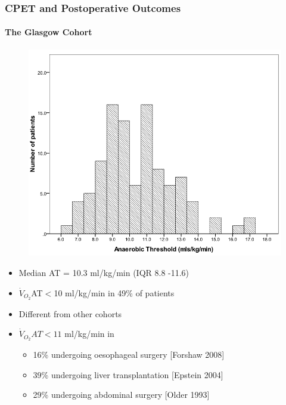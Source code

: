 \documentclass[10pt]{beamer}
\begin{document}
\begin{frame}
	\frametitle{CPET and Postoperative Outcomes}
	\framesubtitle{The Glasgow Cohort}
	\begin{figure}
		\centering
		\includegraphics[height=0.35\textheight]{../Figures/cpet_outcomes_dist_of_AT}
	\end{figure}

	\begin{itemize}
		\item Median AT = 10.3 ml/kg/min (IQR 8.8 -11.6)
		\item $\dot{V}_{O_2}$AT$<$10 ml/kg/min in 49\% of patients
		\item Different from other cohorts
		\item $\dot{V}_{O_2}AT<11$ ml/kg/min in
		\begin{itemize}
			\item 16\% undergoing oesophageal surgery [Forshaw 2008]
			\item 39\% undergoing liver transplantation [Epstein 2004]
			\item 29\% undergoing abdominal surgery [Older 1993]
		\end{itemize}
	\end{itemize}
\end{frame}
\end{document}
